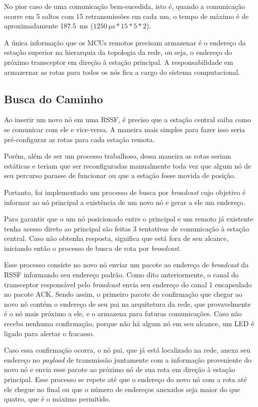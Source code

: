 {No pior caso de uma comunicação bem-sucedida, isto é, quando a comunicação ocorre em 5 saltos com 15
retransmissões em cada um, o tempo de máximo é de aproximadamente \SI{187.5}{\milli \second}
($\SI{1250}{\micro \second} * 15 * 5 * 2$).

A única informação que os MCUs remotos precisam armazenar é o endereço da estação superior na hierarquia da
topologia da rede, ou seja, o endereço do próximo transceptor em direção à estação principal. A
responsabilidade em armazernar as rotas para todos os nós fica a cargo do sistema computacional.

\subsection{Busca do Caminho}
Ao inserir um novo nó em uma RSSF, é preciso que a estação central saiba como se comunicar com ele e
vice-versa. A maneira mais simples para fazer isso seria pré-configurar as rotas para cada estação remota.

Porém, além de ser um processo trabalhoso, dessa maneira as rotas seriam estáticas e teriam que ser
reconfiguradas manualmente toda vez que algum nó de seu percurso parasse de funcionar ou que a estação fosse movida de posição.

Portanto, foi implementado um processo de busca por \textit{broadcast} cujo objetivo é informar ao nó
principal a existência de um novo nó e gerar a ele um endereço.

Para garantir que o um nó posicionado entre o principal e um remoto já existente tenha acesso direto ao
principal são feitas 3 tentativas de comunicação à estação central. Caso não obtenha resposta, significa que
está fora de seu alcance, iniciando então o processo de busca de rota por \textit{broadcast}.

Esse processo consiste no novo nó enviar um pacote ao endereço de \textit{broadcast} da RSSF informando seu
endereço padrão. Como dito anteriormente, o canal do transceptor responsável pelo \textit{broadcast} envia seu
endereço do canal 1 encapsulado no pacote ACK. Sendo assim, o primeiro pacote de confirmação que chegar ao
novo nó contém o endereço de seu pai na arquitetura da rede, que provavelmente é o nó mais próximo a ele, e o
armazena para futuras comunicações. Caso não receba nenhuma confirmação, porque não há algum nó em seu
alcance, um LED é ligado para alertar o fracasso.

Caso essa confirmação ocorra, o nó pai, que já está localizado na rede, anexa seu endereço no \textit{payload}
de transmissão juntamente com a informação proveniente do novo nó e envia esse pacote ao próximo nó de sua
rota em direção à estação principal. Esse processo se repete até que o endereço do novo nó com a rota até ele
chegue no final ou que o número de endereços anexados seja maior do que quatro, que é o máximo permitido.

}
